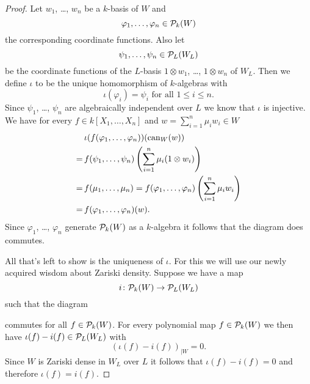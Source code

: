 \begin{proof}
  Let $w_1$, \dots, $w_n$ be a $k$-basis of $W$ and
  \[
        \varphi_1, \dotsc, \varphi_n
    \in \mathcal{P}_k(W)
  \]
  the corresponding coordinate functions. Also let
  \[
        \psi_1, \dotsc, \psi_n
    \in \mathcal{P}_L(W_L)
  \]
  be the coordinate functions of the $L$-basis $1 \otimes w_1$, \dots, $1 \otimes w_n$ of $W_L$.
  Then we define $\iota$ to be the unique homomorphism of $k$-algebras with
  \[
      \iota(\varphi_i)
    = \psi_i
    \text{ for all }
    1 \leq i \leq n.
  \]
  Since $\psi_1$, \dots, $\psi_n$ are algebraically independent over $L$ we know that $\iota$ is injective.
  We have for every $f \in k[X_1, \dotsc, X_n]$ and $w = \sum_{i=1}^n \mu_i w_i \in W$
  \begin{align*}
     &\,  \iota(f(\varphi_1, \dotsc, \varphi_n))(\operatorname{can}_W(w)) \\
    =&\,  f(\psi_1, \dotsc, \psi_n)\left( \sum_{i=1}^n \mu_i (1 \otimes w_i) \right) \\
    =&\,  f(\mu_1, \dotsc, \mu_n)
     =    f(\varphi_1, \dotsc, \varphi_n)\left( \sum_{i=1}^n \mu_i w_i \right) \\
    =&\,  f(\varphi_1, \dotsc, \varphi_n)(w).
  \end{align*}
  Since $\varphi_1$, \dots, $\varphi_n$ generate $\mathcal{P}_k(W)$ as a $k$-algebra it follows that the diagram does commutes.
  
  All that’s left to show is the uniqueness of $\iota$.
  For this we will use our newly acquired wisdom about Zariski density.
  Suppose we have a map
  \[
            i
    \colon  \mathcal{P}_k(W)
    \to     \mathcal{P}_L(W_L)
  \]
  such that the diagram
    \begin{center}
  \end{center}
  commutes for all $f \in \mathcal{P}_k(W)$.
  For every polynomial map $f \in \mathcal{P}_k(W)$ we then have \mbox{$\iota(f)-i(f) \in \mathcal{P}_L(W_L)$} with
  \[
      \left(
        \iota(f)-i(f)
      \right)_{|W}
    = 0.
  \]
  Since $W$ is Zariski dense in $W_L$ over $L$ it follows that $\iota(f) - i(f) = 0$ and therefore $\iota(f) = i(f)$.
\end{proof}


